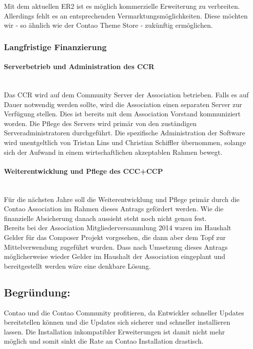 \documentclass[
paper=a4,
draft=false,%
fontsize=10pt%
]{scrartcl}
\begin{document}
Mit dem aktuellen ER2 ist es möglich kommerzielle Erweiterung zu verbreiten. Allerdings fehlt es an entsprechenden Vermarktungsmöglichkeiten. Diese möchten wir - so ähnlich wie der Contao Theme Store - zukünftig ermöglichen.

\subsubsection{Langfristige Finanzierung}

\paragraph{Serverbetrieb und Administration des CCR} ~\\
Das CCR wird auf dem Community Server der Association betrieben. Falls es auf Dauer notwendig werden sollte, wird die Association einen separaten Server zur Verfügung stellen. Dies ist bereits mit dem Association Vorstand kommuniziert worden.
Die Pflege des Servers wird primär von den zuständigen Serveradministratoren durchgeführt. Die spezifische Administration der Software wird unentgeltlich von Tristan Lins und Christian Schiffler übernommen, solange sich der Aufwand in einem wirtschaftlichen akzeptablen Rahmen bewegt.

\paragraph{Weiterentwicklung und Pflege des CCC+CCP} ~\\
Für die nächsten Jahre soll die Weiterentwicklung und Pflege primär durch die Contao Association im Rahmen dieses Antrags gefördert werden. Wie die finanzielle Absicherung danach aussieht steht noch nicht genau fest.\\
Bereits bei der Association Mitgliederversammlung 2014 waren im Haushalt Gelder für das Composer Projekt vorgesehen, die dann aber dem Topf zur Mittelverwendung zugeführt wurden. Dass nach Umsetzung dieses Antrags möglicherweise wieder Gelder im Haushalt der Association eingeplant und bereitgestellt werden wäre eine denkbare Lösung.

\subsection{Begründung: }

Contao und die Contao Community profitieren, da Entwickler schneller Updates bereitstellen können und die Updates sich sicherer und schneller installieren lassen. Die Installation inkompatibler Erweiterungen ist damit nicht mehr möglich und somit sinkt die Rate an  Contao Installation drastisch.
\end{document}
